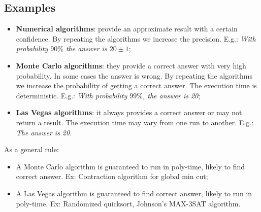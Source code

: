 \subsection{Examples}
\begin{itemize}
    \item \textbf{Numerical algorithms}: provide an approximate result with a certain confidence. By repeating the algorithms we increase the precision. E.g.: \textit{With probability $90\%$ the answer is $20 \pm 1$};
    \item \textbf{Monte Carlo algorithms}: they provide a correct answer with very high probability. In some cases the answer is wrong. By repeating the algorithms we increase the probability of getting a correct answer. The execution time is deterministic. E.g.: \textit{With probability $99\%$, the answer is 20};
    \item \textbf{Las Vegas algorithms}: it always provides a correct answer or may not return a result. The execution time may vary from one run to another. E.g.: \textit{The answer is 20}.
\end{itemize}


As a general rule:
\begin{itemize}
    \item A Monte Carlo algorithm is guaranteed to run in poly-time, likely to find correct answer. Ex: Contraction algorithm for global min cut;
    \item A Las Vegas algorithm is guaranteed to find correct answer, likely to run in poly-time. Ex: Randomized quicksort, Johnson's MAX-3SAT algorithm.
\end{itemize}

